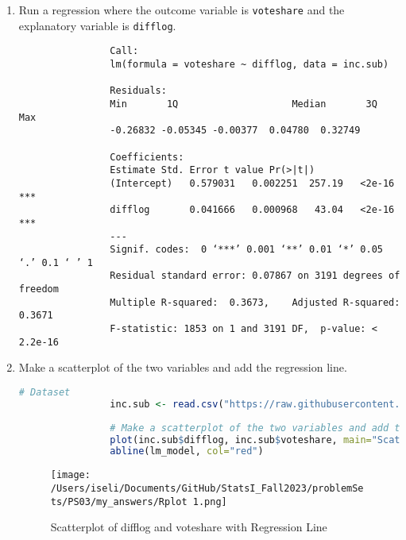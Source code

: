 \documentclass[12pt,letterpaper]{article}
\begin{document}
	\begin{enumerate}
		\item Run a regression where the outcome variable is \texttt{voteshare} and the explanatory variable is \texttt{difflog}.	\vspace{0.05cm}
		
							\vspace{.05cm}
		  
		\begin{footnotesize}
			
			\begin{verbatim}
				Call:
				lm(formula = voteshare ~ difflog, data = inc.sub)
				  
				Residuals:
				Min       1Q   					Median       3Q      Max  
				-0.26832 -0.05345 -0.00377  0.04780  0.32749 
				
				Coefficients:
				Estimate Std. Error t value Pr(>|t|)    
				(Intercept)   0.579031   0.002251  257.19   <2e-16 ***
				difflog       0.041666   0.000968   43.04   <2e-16 ***  
				---
				Signif. codes:  0 ‘***’ 0.001 ‘**’ 0.01 ‘*’ 0.05 ‘.’ 0.1 ‘ ’ 1
				Residual standard error: 0.07867 on 3191 degrees of freedom
				Multiple R-squared:  0.3673,	Adjusted R-squared:  0.3671
				F-statistic: 1853 on 1 and 3191 DF,  p-value: < 2.2e-16
			\end{verbatim}
		\end{footnotesize}
	
		\vspace{0.05cm}
		\item Make a scatterplot of the two variables and add the regression line. 	\vspace{0.05cm}
			\begin{lstlisting}[language=R]
				# Dataset
				inc.sub <- read.csv("https://raw.githubusercontent.com/ASDS-TCD/StatsI_Fall2023/main/datasets/incumbents_subset.csv")
				
				# Make a scatterplot of the two variables and add the regression line
				plot(inc.sub$difflog, inc.sub$voteshare, main="Scatterplot of difflog and voteshare with Regression Line")
				abline(lm_model, col="red")
			\end{lstlisting}			
	\vspace{0.05cm}
	\begin{figure}[h!]
		\centering
		\texttt{[image: /Users/iseli/Documents/GitHub/StatsI\_Fall2023/problemSets/PS03/my\_answers/Rplot 1.png]}
		\caption{Scatterplot of difflog and voteshare with Regression Line}
		\label{fig:scatterplot}
	\end{figure}



\end{enumerate}
\end{document}
